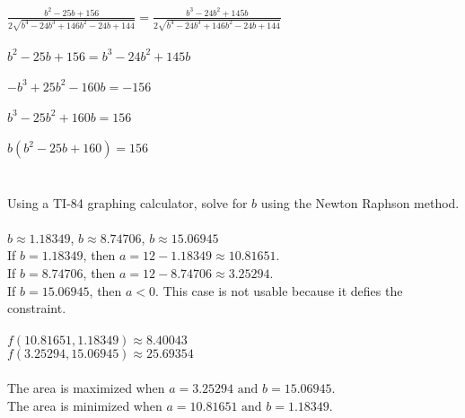\documentclass[12pt]{article}
\begin{document}
\noindent $\frac{b^{2}-25b + 156}{2\sqrt{b^{4} -24b^{3} + 146b^{2}-24b+144}} =\frac{b^{3} -24b^{2} + 145b}{2\sqrt{b^{4} -24b^{3} + 146b^{2}-24b + 144 }}$\\\\
\noindent $b^{2}-25b + 156 = b^{3} - 24b^{2}+145b$\\\\ 
\noindent $-b^{3} + 25b^{2} -160b= -156$\\\\ 
\noindent $b^{3} - 25b^{2} + 160b= 156$\\\\ 
\noindent $b(b^{2} - 25b + 160)= 156$\\\\\\
\noindent Using a TI-84 graphing calculator, solve for $b$ using the Newton Raphson method.\\\\
\noindent $b \approx 1.18349$, \hspace{10pt} $b \approx 8.74706$, $b \approx 15.06945$\\
\noindent If $b = 1.18349$, then $a = 12 -1.18349 \approx 10.81651$.\\
\noindent If $b = 8.74706$, then $a = 12 - 8.74706 \approx 3.25294$.\\
\noindent If $b = 15.06945$, then $a < 0$. This case is not usable because it defies the constraint.\\\\
\noindent $f(10.81651, 1.18349) \approx 8.40043$\\
\noindent $f(3.25294, 15.06945) \approx 25.69354$\\\\
\noindent The area is maximized when  $a = 3.25294 \text{ and } b = 15.06945$.  \\The area is minimized when $a = 10.81651 \text{ and } b = 1.18349$.
 
\end{document}
